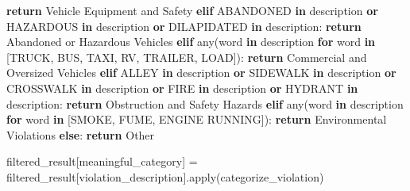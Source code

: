 \documentclass[
  letterpaper,
  DIV=11,
  numbers=noendperiod]{scrartcl}
\newenvironment{Shaded}{\begin{snugshade}}{\end{snugshade}}
\newcommand{\BuiltInTok}[1]{\textcolor[rgb]{0.00,0.23,0.31}{#1}}
\newcommand{\ControlFlowTok}[1]{\textcolor[rgb]{0.00,0.23,0.31}{\textbf{#1}}}
\newcommand{\KeywordTok}[1]{\textcolor[rgb]{0.00,0.23,0.31}{\textbf{#1}}}
\newcommand{\NormalTok}[1]{\textcolor[rgb]{0.00,0.23,0.31}{#1}}
\newcommand{\OperatorTok}[1]{\textcolor[rgb]{0.37,0.37,0.37}{#1}}
\newcommand{\StringTok}[1]{\textcolor[rgb]{0.13,0.47,0.30}{#1}}
\begin{document}
\begin{Shaded}
\begin{Highlighting}[]
        \ControlFlowTok{return} \StringTok{\textquotesingle{}Vehicle Equipment and Safety\textquotesingle{}}
    \ControlFlowTok{elif} \StringTok{\textquotesingle{}ABANDONED\textquotesingle{}} \KeywordTok{in}\NormalTok{ description }\KeywordTok{or} \StringTok{\textquotesingle{}HAZARDOUS\textquotesingle{}} \KeywordTok{in}\NormalTok{ description }\KeywordTok{or} \StringTok{\textquotesingle{}DILAPIDATED\textquotesingle{}} \KeywordTok{in}\NormalTok{ description:}
        \ControlFlowTok{return} \StringTok{\textquotesingle{}Abandoned or Hazardous Vehicles\textquotesingle{}}
    \ControlFlowTok{elif} \BuiltInTok{any}\NormalTok{(word }\KeywordTok{in}\NormalTok{ description }\ControlFlowTok{for}\NormalTok{ word }\KeywordTok{in}\NormalTok{ [}\StringTok{\textquotesingle{}TRUCK\textquotesingle{}}\NormalTok{, }\StringTok{\textquotesingle{}BUS\textquotesingle{}}\NormalTok{, }\StringTok{\textquotesingle{}TAXI\textquotesingle{}}\NormalTok{, }\StringTok{\textquotesingle{}RV\textquotesingle{}}\NormalTok{, }\StringTok{\textquotesingle{}TRAILER\textquotesingle{}}\NormalTok{, }\StringTok{\textquotesingle{}LOAD\textquotesingle{}}\NormalTok{]):}
        \ControlFlowTok{return} \StringTok{\textquotesingle{}Commercial and Oversized Vehicles\textquotesingle{}}
    \ControlFlowTok{elif} \StringTok{\textquotesingle{}ALLEY\textquotesingle{}} \KeywordTok{in}\NormalTok{ description }\KeywordTok{or} \StringTok{\textquotesingle{}SIDEWALK\textquotesingle{}} \KeywordTok{in}\NormalTok{ description }\KeywordTok{or} \StringTok{\textquotesingle{}CROSSWALK\textquotesingle{}} \KeywordTok{in}\NormalTok{ description }\KeywordTok{or} \StringTok{\textquotesingle{}FIRE\textquotesingle{}} \KeywordTok{in}\NormalTok{ description }\KeywordTok{or} \StringTok{\textquotesingle{}HYDRANT\textquotesingle{}} \KeywordTok{in}\NormalTok{ description:}
        \ControlFlowTok{return} \StringTok{\textquotesingle{}Obstruction and Safety Hazards\textquotesingle{}}
    \ControlFlowTok{elif} \BuiltInTok{any}\NormalTok{(word }\KeywordTok{in}\NormalTok{ description }\ControlFlowTok{for}\NormalTok{ word }\KeywordTok{in}\NormalTok{ [}\StringTok{\textquotesingle{}SMOKE\textquotesingle{}}\NormalTok{, }\StringTok{\textquotesingle{}FUME\textquotesingle{}}\NormalTok{, }\StringTok{\textquotesingle{}ENGINE RUNNING\textquotesingle{}}\NormalTok{]):}
        \ControlFlowTok{return} \StringTok{\textquotesingle{}Environmental Violations\textquotesingle{}}
    \ControlFlowTok{else}\NormalTok{:}
        \ControlFlowTok{return} \StringTok{\textquotesingle{}Other\textquotesingle{}}

\NormalTok{filtered\_result[}\StringTok{\textquotesingle{}meaningful\_category\textquotesingle{}}\NormalTok{] }\OperatorTok{=}\NormalTok{ filtered\_result[}\StringTok{\textquotesingle{}violation\_description\textquotesingle{}}\NormalTok{].}\BuiltInTok{apply}\NormalTok{(categorize\_violation)}


\end{Highlighting}
\end{Shaded}
\end{document}
